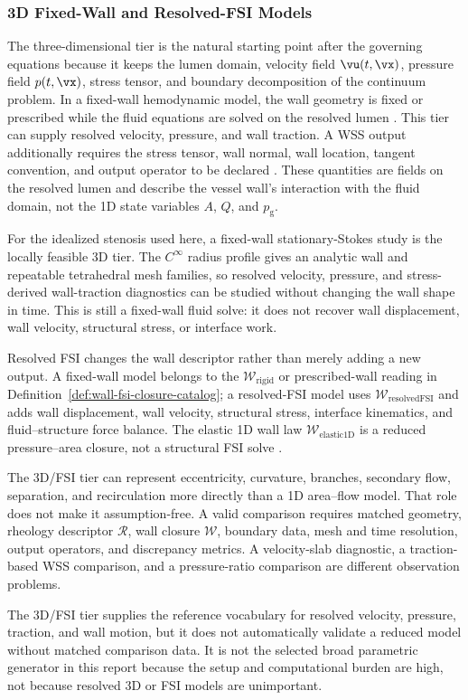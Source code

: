 \subsubsection{3D Fixed-Wall and Resolved-FSI Models}
\label{subsubsec:3d-models}

The three-dimensional tier is the natural starting point after the governing
equations because it keeps the lumen domain, velocity field $\vu(t,\vx)$,
pressure field $p(t,\vx)$, stress tensor, and boundary decomposition of the
continuum problem. In a fixed-wall hemodynamic model, the wall geometry is fixed
or prescribed while the fluid equations are solved on the resolved lumen
\cite{QuarteroniFormaggia2004CardiovascularModeling}. This tier can supply
resolved velocity, pressure, and wall traction. A WSS output additionally
requires the stress tensor, wall normal, wall location, tangent convention, and
output operator to be declared
\cite{JohnEtAl2017WallShearStressVectorForm}. These quantities are fields on
the resolved lumen and describe the vessel wall's interaction with the fluid
domain, not the 1D state variables $A$, $Q$, and $p_{\mathrm g}$.

For the idealized stenosis used here, a fixed-wall stationary-Stokes study is
the locally feasible 3D tier. The $C^\infty$ radius profile gives an analytic
wall and repeatable tetrahedral mesh families, so resolved velocity, pressure,
and stress-derived wall-traction diagnostics can be studied without changing
the wall shape in time. This is still a fixed-wall fluid solve: it does not
recover wall displacement, wall velocity, structural stress, or interface work.

Resolved FSI changes the wall descriptor rather than merely adding a new output.
A fixed-wall model belongs to the $\mathcal W_{\mathrm{rigid}}$ or
prescribed-wall reading in Definition~\ref{def:wall-fsi-closure-catalog}; a
resolved-FSI model uses $\mathcal W_{\mathrm{resolvedFSI}}$ and adds wall
displacement, wall velocity, structural stress, interface kinematics, and
fluid--structure force balance. The elastic 1D wall law
$\mathcal W_{\mathrm{elastic1D}}$ is a reduced pressure--area closure, not a
structural FSI solve
\cite{FormaggiaEtAl2007FSICoupling,GaldiEtAl2008HemodynamicalFlows}.

The 3D/FSI tier can represent eccentricity, curvature, branches, secondary
flow, separation, and recirculation more directly than a 1D area--flow model.
That role does not make it assumption-free. A valid comparison requires matched
geometry, rheology descriptor $\mathcal R$, wall closure $\mathcal W$, boundary
data, mesh and time resolution, output operators, and discrepancy metrics. A
velocity-slab diagnostic, a traction-based WSS comparison, and a pressure-ratio
comparison are different observation problems.

The 3D/FSI tier supplies the reference vocabulary for resolved velocity,
pressure, traction, and wall motion, but it does not automatically validate a
reduced model without matched comparison data. It is not the selected broad
parametric generator in this report because the setup and computational burden
are high, not because resolved 3D or FSI models are unimportant.
